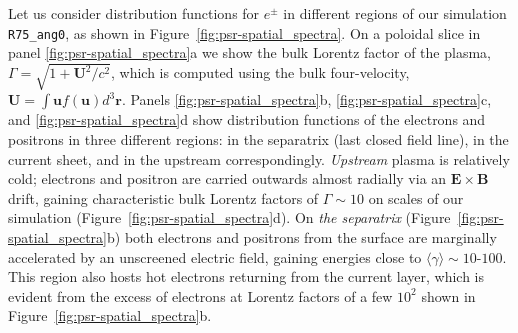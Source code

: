 \begin{figure}[htb]
\end{figure}

Let us consider distribution functions for $e^\pm$ in different regions of our simulation \texttt{R75\_ang0}, as shown in Figure~\ref{fig:psr-spatial_spectra}. On a poloidal slice in panel \ref{fig:psr-spatial_spectra}a we show the bulk Lorentz factor of the plasma, $\Gamma = \sqrt{1 + \bm{U}^2/c^2}$, which is computed using the bulk four-velocity, $\bm{U} = \int \bm{u}f(\bm{u})d^3\bm{r}$. Panels \ref{fig:psr-spatial_spectra}b, \ref{fig:psr-spatial_spectra}c, and \ref{fig:psr-spatial_spectra}d show distribution functions of the electrons and positrons in three different regions: in the separatrix (last closed field line), in the current sheet, and in the upstream correspondingly. \emph{Upstream} plasma is relatively cold; electrons and positron are carried outwards almost radially via an $\bm{E}\times\bm{B}$ drift, gaining characteristic bulk Lorentz factors of $\Gamma \sim 10$ on scales of our simulation (Figure~\ref{fig:psr-spatial_spectra}d). On \emph{the separatrix} (Figure~\ref{fig:psr-spatial_spectra}b) both electrons and positrons from the surface are marginally accelerated by an unscreened electric field, gaining energies close to $\langle\gamma \rangle\sim 10\text{-}100$. This region also hosts hot electrons returning from the current layer, which is evident from the excess of electrons at Lorentz factors of a few $10^2$ shown in Figure~\ref{fig:psr-spatial_spectra}b. 

